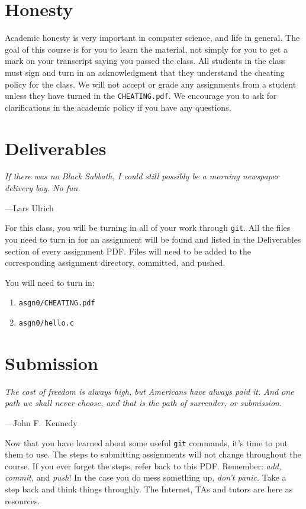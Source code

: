 \documentclass[11pt]{article}
\newcommand\asgn[0]{asgn0}
\begin{document}
\section{Honesty}

Academic honesty is very important in computer science, and life in general. The
goal of this course is for you to learn the material, not simply for you to get
a mark on your transcript saying you passed the class. All students in the class
must sign and turn in an acknowledgment that they understand the cheating policy
for the class. We will not accept or grade any assignments from a student unless
they have turned in the \texttt{CHEATING.pdf}. We encourage you to ask for
clarifications in the academic policy if you have any questions.

\section{Deliverables}

\epigraph{\emph{If there was no Black Sabbath, I could still possibly be a
morning newspaper delivery boy. No fun.}}{---Lars Ulrich}

\noindent For this class, you will be turning in all of your work through
\texttt{git}. All the files you need to turn in for an assignment will be found
and listed in the Deliverables section of every assignment PDF. Files will need
to be added to the corresponding assignment directory, committed, and pushed.

You will need to turn in:
\begin{enumerate}
	\item \texttt{\asgn/CHEATING.pdf}
	\item \texttt{\asgn/hello.c}
\end{enumerate}

\section{Submission}

\epigraph{\emph{The cost of freedom is always high, but Americans have always
paid it. And one path we shall never choose, and that is the path of
surrender, or submission.}}{---John F.\ Kennedy}\noindent

\noindent Now that you have learned about some useful \texttt{git} commands,
it's time to put them to use. The steps to submitting assignments will not
change throughout the course. If you ever forget the steps, refer back to this
PDF. Remember: \emph{add, commit,} and \emph{push}! In the case you do mess
something up, \emph{don't panic.} Take a step back and think things throughly.
The Internet, TAs and tutors are here as resources.
\end{document}
